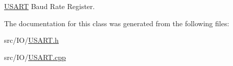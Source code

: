 \hyperlink{classUSART}{U\+S\+A\+RT} Baud Rate Register. 



The documentation for this class was generated from the following files\+:\begin{DoxyCompactItemize}
\item 
src/\+I\+O/\hyperlink{USART_8h}{U\+S\+A\+R\+T.\+h}\item 
src/\+I\+O/\hyperlink{USART_8cpp}{U\+S\+A\+R\+T.\+cpp}\end{DoxyCompactItemize}
